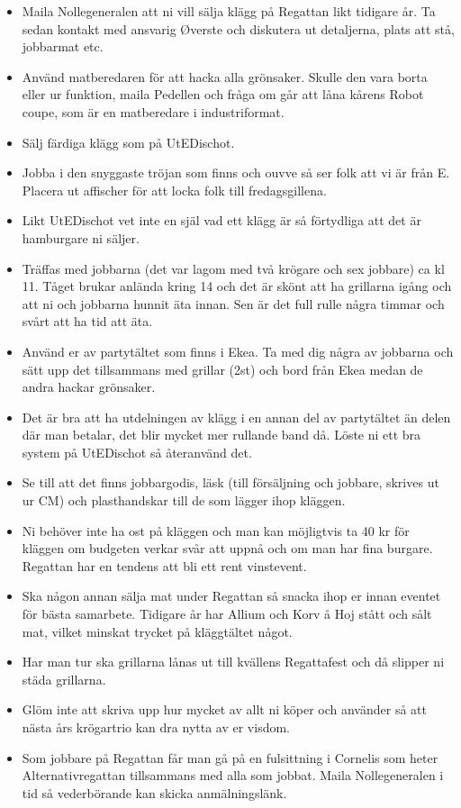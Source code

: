 \documentclass[10pt]{article}
\begin{document}
\begin{itemize}
	\item Maila Nollegeneralen att ni vill sälja klägg på Regattan likt tidigare år. Ta sedan kontakt med ansvarig Øverste och diskutera ut detaljerna, plats att stå, jobbarmat etc.
    \item Använd matberedaren för att hacka alla grönsaker. Skulle den vara borta eller ur funktion, maila Pedellen och fråga om går att låna kårens Robot coupe, som är en matberedare i industriformat.
    \item Sälj färdiga klägg som på UtEDischot.
    \item Jobba i den snyggaste tröjan som finns och ouvve så ser folk att vi är från E. Placera ut affischer för att locka folk till fredagsgillena.
    \item Likt UtEDischot vet inte en själ vad ett klägg är så förtydliga att det är hamburgare ni säljer.
    \item Träffas med jobbarna (det var lagom med två krögare och sex jobbare) ca kl 11. Tåget brukar anlända kring 14 och det är skönt att ha grillarna igång och att ni
och jobbarna hunnit äta innan. Sen är det full rulle några timmar och svårt att ha
tid att äta.
	\item Använd er av partytältet som finns i Ekea. Ta med dig några av jobbarna och sätt
upp det tillsammans med grillar (2st) och bord från Ekea medan de andra hackar grönsaker.
	\item Det är bra att ha utdelningen av klägg i en annan del av partytältet än delen där man betalar, det blir mycket mer rullande band då. Löste ni ett bra system på UtEDischot så återanvänd det.
    \item Se till att det finns jobbargodis, läsk (till försäljning och jobbare, skrives ut ur CM) och plasthandskar till de som lägger ihop kläggen.
    \item Ni behöver inte ha ost på kläggen och man kan möjligtvis ta 40 kr för kläggen om
budgeten verkar svår att uppnå och om man har fina burgare. Regattan har en tendens att bli ett rent vinstevent.
	\item Ska någon annan sälja mat under Regattan så snacka ihop er innan eventet för bästa samarbete. Tidigare år har Allium och Korv å Hoj stått och sålt mat, vilket minskat trycket på kläggtältet något.
	\item Har man tur ska grillarna lånas ut till kvällens Regattafest och då slipper ni städa grillarna.
    \item Glöm inte att skriva upp hur mycket av allt ni köper och använder så att nästa års krögartrio kan dra nytta av er visdom.
    \item Som jobbare på Regattan får man gå på en fulsittning i Cornelis som heter Alternativregattan tillsammans med alla som jobbat. Maila Nollegeneralen i tid så vederbörande kan skicka anmälningslänk.

\end{itemize}
\end{document}
